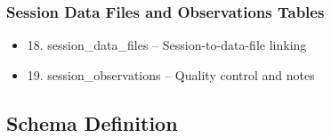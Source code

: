 \documentclass[12pt, titlepage]{article}
\begin{document}
\subsubsection{Session Data Files and Observations Tables}

\begin{itemize}

	\item{18. session\_data\_files – Session-to-data-file linking}
	\item{19. session\_observations – Quality control and notes}

\end{itemize}

\subsection{Schema Definition}
\end{document}
